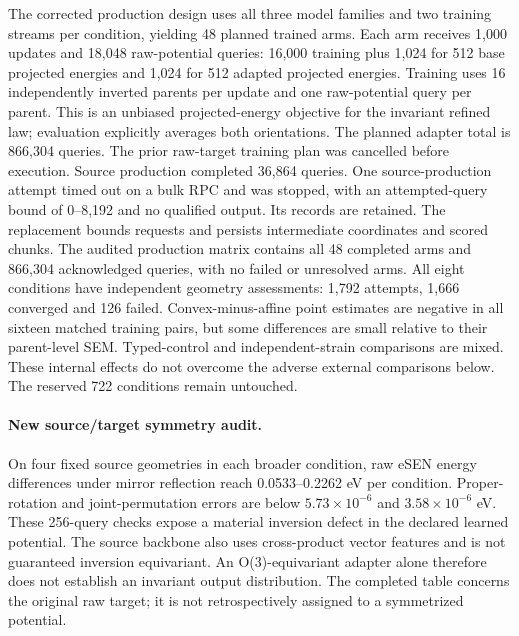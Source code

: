 The corrected production design uses all three model families and two training
streams per condition, yielding 48 planned trained arms. Each arm receives
1,000 updates and 18,048 raw-potential queries: 16,000 training plus 1,024 for
512 base projected energies and 1,024 for 512 adapted projected energies.
Training uses 16 independently inverted parents per update and one raw-potential
query per parent. This is an unbiased projected-energy objective for the
invariant refined law; evaluation explicitly averages both orientations.
The planned adapter total is 866,304 queries. The prior raw-target training
plan was cancelled before execution. Source production completed 36,864 queries.
One source-production attempt timed
out on a bulk RPC and was stopped, with an attempted-query bound of 0--8,192
and no qualified output. Its records are retained. The replacement bounds
requests and persists intermediate coordinates and scored chunks.
The audited production matrix contains all 48 completed arms and 866,304
acknowledged queries, with no failed or unresolved arms. All eight conditions
have independent geometry assessments: 1,792 attempts, 1,666 converged and 126
failed. Convex-minus-affine point estimates are negative in all sixteen matched
training pairs, but some differences are small relative to their parent-level
SEM. Typed-control and independent-strain comparisons are mixed. These internal
effects do not overcome the adverse external comparisons below. The reserved
722 conditions remain untouched.

\paragraph{New source/target symmetry audit.}
On four fixed source geometries in each broader condition, raw eSEN energy
differences under mirror reflection reach 0.0533--0.2262 eV per condition.
Proper-rotation and joint-permutation errors are below $5.73\times10^{-6}$
and $3.58\times10^{-6}$ eV. These 256-query checks expose a material inversion
defect in the declared learned potential. The source backbone also uses
cross-product vector features and is not guaranteed inversion equivariant.
An O(3)-equivariant adapter alone therefore does not establish an invariant
output distribution. The completed table concerns the original raw target;
it is not retrospectively assigned to a symmetrized potential.

